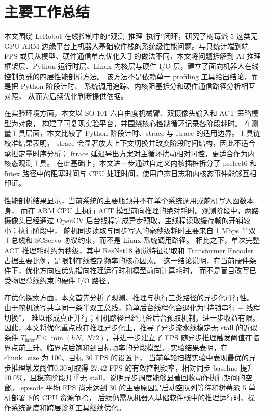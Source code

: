 \section{主要工作总结}

本文围绕 LeRobot 在线控制中的“观测--推理--执行”闭环，研究了树莓派 5
这类无 GPU ARM 边缘平台上机器人基础软件栈的系统级性能问题。与只统计端到端
FPS 或只从模型、硬件通信单点优化入手的做法不同，本文将问题拆解到 AI 推理框架层、Python 运行时层、Linux
内核层与硬件 I/O 层，建立了面向机器人在线控制负载的四层性能剖析方法。
该方法不是依赖单一 profiling 工具给出结论，而是把 Python 阶段计时、
系统调用追踪、内核阻塞拆分和硬件通信路径分析相互对照，
从而为后续优化判断提供依据。

在实验环境方面，本文以 SO-101 六自由度机械臂、双摄像头输入和 ACT 策略模型为对象，
构建了可复现实验平台，并围绕核心控制循环记录各阶段耗时。
在测量工具层面，本文比较了 Python 阶段计时、strace
与 ftrace 的适用边界。工具链校准结果表明，
strace 会显著放大上下文切换并改变阶段时间结构，因此不适合承担定量时序分析；
ftrace 延迟导出方案对主循环扰动相对可控，更适合作为内核态观测工具。
在此基础上，本文进一步通过自定义内核插桩拆分了 pselect6 和
futex 路径中的阻塞时间与 CPU 处理时间，使用户态日志和内核态事件能够互相印证。

性能剖析结果显示，当前系统的主要瓶颈并不在单个系统调用或舵机写入函数本身，
而在 ARM CPU 上执行 ACT 模型前向推理的绝对耗时。观测阶段中，两路摄像头已经通过
OpenCV 后台线程完成异步预取，主线程读取缓存帧的开销较小；执行阶段中，
舵机同步读取与同步写入的毫秒级耗时主要来自
1 Mbps 半双工总线和 SCServo 协议约束，而不是 Linux 系统调用路径。
相比之下，单次完整 ACT 推理耗时约为秒级，其中 ResNet18 视觉特征提取和
Transformer Encoder 占据主要比例，是限制在线控制频率的核心因素。
这一结论说明，在当前硬件条件下，优化方向应优先指向推理运行时和模型前向计算耗时，
而不是盲目改写已受物理总线约束的硬件 I/O 路径。

在优化探索方面，本文首先分析了观测、推理与执行三类路径的异步化可行性。
由于舵机读写共享同一条半双工总线，简单后台线程化会退化为“持锁串行 + 线程切换”，
难以形成真正并行；相机路径已经具备后台预取机制，进一步收益有限。
因此，本文将优化重点放在推理异步化上，推导了异步流水线稳定无 stall 的近似条件
\(T_{\text{infer}}F \leq \min(hN,\;N/2)\)，并进一步建立了
FPS 随异步推理触发阈值在临界点前上升、临界点后饱和到目标帧率的分段模型。
实验结果表明，在 chunk\_size 为 100、目标 30 FPS 的设置下，
当前单轮扫描实验中表现最优的异步推理触发阈值0.30可取得 27.42 FPS 的有效控制频率，相对同步 baseline
提升 70.0\%，且稳态阶段几乎无 stall，说明异步调度能够显著回收动作执行期间的空窗。
episode 平均 FPS 尚未达到 30 的主要原因是启动空队列等待和树莓派 5 单机部署下的 CPU 资源争抢，
后续仍需从机器人基础软件栈中的推理运行时、操作系统调度和跨层诊断工具继续优化。
